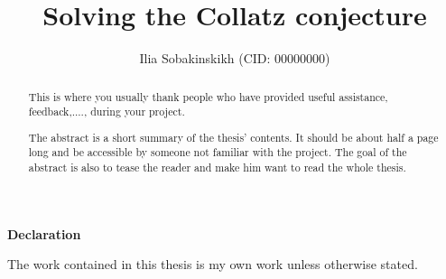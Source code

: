 \documentclass[a4paper, twoside]{report}
\title{Solving the Collatz conjecture}
\author{Ilia Sobakinskikh  (CID: 00000000)}
\theoremstyle{definition}
\newtheorem{remark}[theorem]{Remark}
\numberwithin{equation}{section}
\begin{document}


\mbox{}\newline\vspace{10mm} \mbox{}\LARGE
%
{\bf Declaration} \normalsize \vspace{5mm}

The work contained in this thesis is my own work unless otherwise stated.

\newpage

\renewcommand{\abstractname}{Acknowledgements}
\begin{abstract}
    This is where you usually thank people who have provided useful assistance, feedback,...., during your project.
\end{abstract}

\newpage

\renewcommand{\abstractname}{Abstract}
\begin{abstract}
    The abstract is a short summary of the thesis' contents.
    It should be about half a page long and be accessible by someone not familiar with the project.
    The goal of the abstract is also to tease the reader and make him want to read the whole thesis.
\end{abstract}

\tableofcontents
\listoffigures
\listoftables










\end{document}
